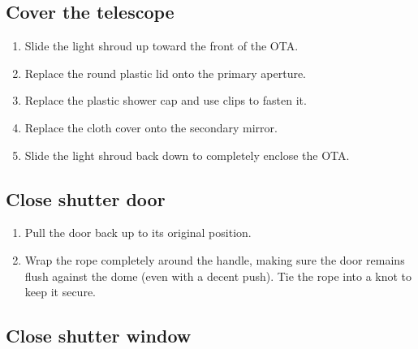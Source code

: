 \documentclass{article}
\begin{document}
	\subsection{Cover the telescope}
	
	\begin{enumerate}
		
		\item Slide the light shroud up toward the front of the OTA.
		
		\item Replace the round plastic lid onto the primary aperture.
		
		\item Replace the plastic shower cap and use clips to fasten it.
		
		\item Replace the cloth cover onto the secondary mirror.
		
		\item Slide the light shroud back down to completely enclose the OTA.
		
	\end{enumerate}
	
	\subsection{Close shutter door}
	
	\begin{enumerate}
		
		\item Pull the door back up to its original position.
		
		\item Wrap the rope completely around the handle, making sure the door remains flush against the dome (even with a decent push). Tie the rope into a knot to keep it secure.
		
	\end{enumerate}
	
	\subsection{Close shutter window}
	
\end{document}

